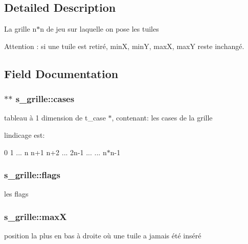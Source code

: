 \subsection{Detailed Description}
La grille n$\ast$n de jeu sur laquelle on pose les tuiles \begin{DoxyAttention}{Attention}
\+: si une tuile est retiré, \textquotesingle{}minX\textquotesingle{}, \textquotesingle{}minY\textquotesingle{}, \textquotesingle{}maxX\textquotesingle{}, \textquotesingle{}maxY\textquotesingle{} reste inchangé. 
\end{DoxyAttention}


\subsection{Field Documentation}
\subsubsection[{\texorpdfstring{cases}{cases}}]{$\ast$$\ast$ s\+\_\+grille\+::cases}\hypertarget{structs__grille_a0c83208ed3489d20fb32a4bd8269328e}{}\label{structs__grille_a0c83208ed3489d20fb32a4bd8269328e}
tableau à 1 dimension de \textquotesingle{}t\+\_\+case $\ast$\textquotesingle{}, contenant\+: les cases de la grille

l\textquotesingle{}indicage est\+:

0 1 ... n n+1 n+2 ... 2n-\/1 ... ... n$\ast$n-\/1 
\subsubsection[{\texorpdfstring{flags}{flags}}]{ s\+\_\+grille\+::flags}\hypertarget{structs__grille_aea8fdcb6be083042616784eaa97b45be}{}\label{structs__grille_aea8fdcb6be083042616784eaa97b45be}
les flags 
\subsubsection[{\texorpdfstring{maxX}{maxX}}]{ s\+\_\+grille\+::maxX}\hypertarget{structs__grille_a08e437d260f36932a3f1514d778a401a}{}\label{structs__grille_a08e437d260f36932a3f1514d778a401a}
position la plus en bas à droite où une tuile a jamais été inséré 
